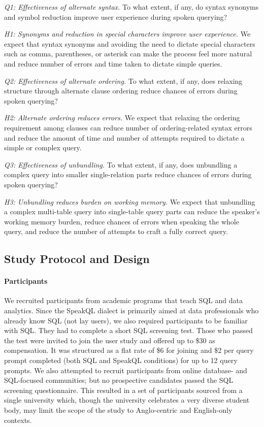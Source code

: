 \vspace{2mm}
\textit{Q1: Effectiveness of alternate syntax.} To what extent, if any, do syntax synonyms and symbol reduction improve user experience during spoken querying?

\vspace{2mm} 
\textit{H1: Synonyms and reduction in special characters improve user experience.} 
We expect that syntax synonyms and avoiding the need to dictate special characters such as comma, parentheses, or asterisk can make the process feel more natural and reduce number of errors and time taken to dictate simple queries. 

\vspace{2mm}
\textit{Q2: Effectiveness of alternate ordering.} To what extent, if any, does relaxing structure through alternate clause ordering reduce chances of errors during spoken querying?

\vspace{2mm} 
\textit{H2: Alternate ordering reduces errors.} 
We expect that relaxing the ordering requirement among clauses can reduce number of ordering-related syntax errors and reduce the amount of time and number of attempts required to dictate a simple or complex query. 

\vspace{2mm}
\textit{Q3: Effectiveness of unbundling.} To what extent, if any, does unbundling a complex query into smaller single-relation parts reduce chances of errors during spoken querying?

\vspace{2mm} 
\textit{H3: Unbundling reduces burden on working memory.} 
We expect that unbundling a complex multi-table query into single-table query parts can reduce the speaker's working memory burden, reduce chances of errors when speaking the whole query, and reduce the number of attempts to craft a fully correct query.


\subsection{Study Protocol and Design}


\paragraph{\textbf{Participants}}
We recruited participants from academic programs that teach SQL and data analytics.  
Since the SpeakQL dialect is primarily aimed at data professionals who already know SQL (not lay users), we also required participants to be familiar with SQL. They had to complete a short SQL screening test. 
Those who passed the test were invited to join the user study and offered up to \$30 as compensation. 
It was structured as a flat rate of \$6 for joining and \$2 per query prompt completed (both SQL and SpeakQL conditions) for up to 12 query prompts. 
We also attempted to recruit participants from online database- and SQL-focused communities; but no prospective candidates passed the SQL screening questionnaire. This resulted in a set of participants sourced from a single university which, though the university celebrates a very diverse student body, may limit the scope of the study to Anglo-centric and English-only contexts.


